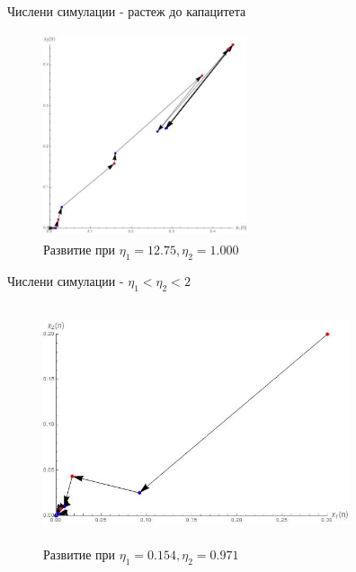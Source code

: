 \begin{frame}[t]{Числени симулации - растеж до капацитета}

  \begin{center}
    \begin{figure}[htp]
      \includegraphics[width=6cm,height=6cm]
      {migrationSimulation3}
      \caption{Развитие при $\eta_{1}=12.75, \eta_{2}=1.000$}
    \end{figure}
  \end{center}

\end{frame}

\begin{frame}[t]{Числени симулации - $\eta_{1} < \eta_{2} < 2$}

  \begin{center}
    \begin{figure}[htp]
      \includegraphics[width=9cm,height=7cm]
      {migrationSimulation4}
      \caption{Развитие при $\eta_{1}=0.154, \eta_{2}=0.971$}
    \end{figure}
  \end{center}

\end{frame}
